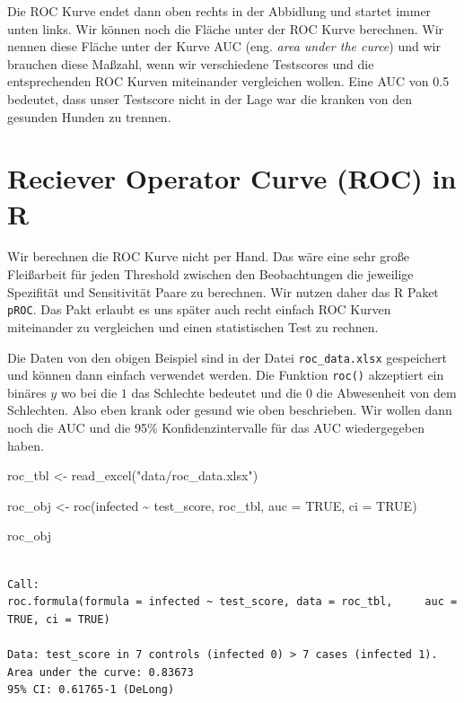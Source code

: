 \documentclass[
  letterpaper,
]{scrbook}
\newenvironment{Shaded}{\begin{snugshade}}{\end{snugshade}}
\newcommand{\AttributeTok}[1]{\textcolor[rgb]{0.40,0.45,0.13}{#1}}
\newcommand{\ConstantTok}[1]{\textcolor[rgb]{0.56,0.35,0.01}{#1}}
\newcommand{\FunctionTok}[1]{\textcolor[rgb]{0.28,0.35,0.67}{#1}}
\newcommand{\NormalTok}[1]{\textcolor[rgb]{0.00,0.23,0.31}{#1}}
\newcommand{\OtherTok}[1]{\textcolor[rgb]{0.00,0.23,0.31}{#1}}
\newcommand{\SpecialCharTok}[1]{\textcolor[rgb]{0.37,0.37,0.37}{#1}}
\newcommand{\StringTok}[1]{\textcolor[rgb]{0.13,0.47,0.30}{#1}}
\begin{document}
Die ROC Kurve endet dann oben rechts in der Abbidlung und startet immer
unten links. Wir können noch die Fläche unter der ROC Kurve berechnen.
Wir nennen diese Fläche unter der Kurve AUC (eng. \emph{area under the
curce}) und wir brauchen diese Maßzahl, wenn wir verschiedene Testscores
und die entsprechenden ROC Kurven miteinander vergleichen wollen. Eine
AUC von 0.5 bedeutet, dass unser Testscore nicht in der Lage war die
kranken von den gesunden Hunden zu trennen.

\hypertarget{reciever-operator-curve-roc-in-r}{%
\section{Reciever Operator Curve (ROC) in
R}\label{reciever-operator-curve-roc-in-r}}

Wir berechnen die ROC Kurve nicht per Hand. Das wäre eine sehr große
Fleißarbeit für jeden Threshold zwischen den Beobachtungen die jeweilige
Spezifität und Sensitivität Paare zu berechnen. Wir nutzen daher das R
Paket \texttt{pROC}. Das Pakt erlaubt es uns später auch recht einfach
ROC Kurven miteinander zu vergleichen und einen statistischen Test zu
rechnen.

Die Daten von den obigen Beispiel sind in der Datei
\texttt{roc\_data.xlsx} gespeichert und können dann einfach verwendet
werden. Die Funktion \texttt{roc()} akzeptiert ein binäres \(y\) wo bei
die \(1\) das Schlechte bedeutet und die \(0\) die Abwesenheit von dem
Schlechten. Also eben krank oder gesund wie oben beschrieben. Wir wollen
dann noch die AUC und die 95\% Konfidenzintervalle für das AUC
wiedergegeben haben.

\begin{Shaded}
\begin{Highlighting}[]
\NormalTok{roc\_tbl }\OtherTok{\textless{}{-}} \FunctionTok{read\_excel}\NormalTok{(}\StringTok{"data/roc\_data.xlsx"}\NormalTok{) }

\NormalTok{roc\_obj }\OtherTok{\textless{}{-}} \FunctionTok{roc}\NormalTok{(infected }\SpecialCharTok{\textasciitilde{}}\NormalTok{ test\_score, roc\_tbl, }\AttributeTok{auc =} \ConstantTok{TRUE}\NormalTok{, }\AttributeTok{ci =} \ConstantTok{TRUE}\NormalTok{)}

\NormalTok{roc\_obj}
\end{Highlighting}
\end{Shaded}

\begin{verbatim}

Call:
roc.formula(formula = infected ~ test_score, data = roc_tbl,     auc = TRUE, ci = TRUE)

Data: test_score in 7 controls (infected 0) > 7 cases (infected 1).
Area under the curve: 0.83673
95% CI: 0.61765-1 (DeLong)
\end{verbatim}
\end{document}
